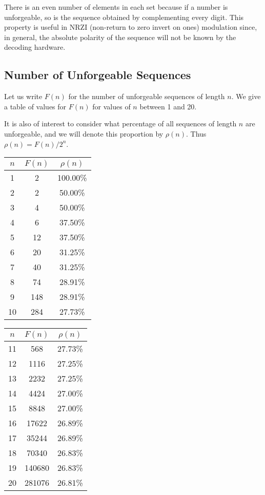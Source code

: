 \documentclass[12pt]{article}
\begin{document}
\noindent
There is an even number of elements in each set because if 
a number is unforgeable, so is the sequence obtained by complementing
every digit.  This property is useful in NRZI (non-return to zero
invert on ones) modulation since, in general, the absolute polarity
of the sequence will not be known by the decoding hardware.  

\subsection*{Number of Unforgeable Sequences}

Let us write $F(n)$ for the number of unforgeable sequences of length
$n$.  We give a table of values for $F(n)$ for values of $n$ between
1 and 20.

It is also of interest to consider what percentage of all sequences
of length $n$ are unforgeable, and we will denote this proportion
by $\rho(n)$.  Thus $\rho(n) = F(n)/2^n$.
\bigskip

\hfill
\begin{tabular}{|c|c|c|}
\hline
$n$ & $F(n)$ & $\rho(n)$ \\
\hline
1 & 2 & 100.00\% \\
2 & 2 &  50.00\% \\
3 & 4 &  50.00\% \\
4 & 6 &  37.50\% \\
5 & 12 &  37.50\% \\
6 & 20 &  31.25\% \\
7 & 40 &  31.25\% \\
8 & 74 &  28.91\% \\
9 & 148 &  28.91\% \\
10 & 284 &  27.73\% \\
\hline
\end{tabular}
\hfill
\begin{tabular}{|c|c|c|}
\hline
$n$ & $F(n)$ & $\rho(n)$ \\
\hline
11 & 568 &  27.73\% \\
12 & 1116 &  27.25\% \\
13 & 2232 &  27.25\% \\
14 & 4424 &  27.00\% \\
15 & 8848 &  27.00\% \\
16 & 17622 &  26.89\% \\
17 & 35244 &  26.89\% \\
18 & 70340 &  26.83\% \\
19 & 140680 &  26.83\% \\
20 & 281076 &  26.81\% \\
\hline
\end{tabular}
\hfill\null
\end{document}
